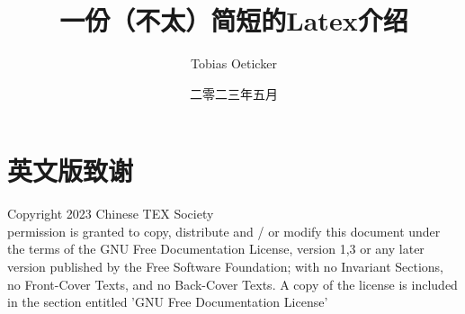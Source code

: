 \documentclass[12pt, a4paper, oneside]{ctexart}
\title{一份（不太）简短的Latex介绍}
\author{Tobias Oeticker}
\date{二零二三年五月}
\begin{document}
\simsun
\maketitle

\section{英文版致谢}
	\noindent
		Copyright 2023 Chinese TEX Society\\
		permission is granted to copy, distribute and / or modify this document under the terms of the GNU Free Documentation License, version 1,3 or any later version published by the Free Software Foundation; with no Invariant Sections, no  Front-Cover Texts, and no Back-Cover Texts. A copy of the license is included in the section entitled 'GNU Free Documentation License' 
\end{document}
